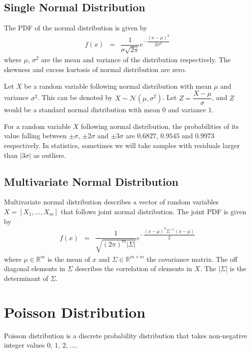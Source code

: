 \subsection{Single Normal Distribution}

The PDF of the normal distribution is given by
\begin{eqnarray}
  f(x) &=& \dfrac{1}{\sigma\sqrt{2\pi}}e^{-\dfrac{(x-\mu)^2}{2\sigma^2}} \nonumber
\end{eqnarray}
where $\mu$, $\sigma^2$ are the mean and variance of the distribution respectively. The skewness and excess kurtosis of normal distribution are zero.

Let $X$ be a random variable following normal distribution with mean $\mu$ and variance $\sigma^2$. This can be denoted by $X\sim\mathcal{N}(\mu, \sigma^2)$. Let $Z=\dfrac{X-\mu}{\sigma}$, and $Z$ would be a standard normal distribution with mean $0$ and variance $1$.

For a random variable $X$ following normal distribution, the probabilities of its value falling between $\pm \sigma$, $\pm 2\sigma$ and $\pm 3\sigma$ are $0.6827$, $0.9545$ and $0.9973$ respectively. In statistics, sometimes we will take samples with residuals larger than $|3\sigma|$ as outliers.

\subsection{Multivariate Normal Distribution}

Multivariate normal distribution describes a vector of random variables $X = \left[X_1, \ldots, X_m\right]$ that follows joint normal distribution. The joint PDF is given by
\begin{eqnarray}
  f(x) &=& \dfrac{1}{\sqrt{(2\pi)^m|\Sigma|}}e^{-\dfrac{(x-\mu)^T\Sigma^{-1}(x-\mu)}{2}} \nonumber
\end{eqnarray}
where $\mu \in \mathbb{R}^m$ is the mean of $x$ and $\Sigma \in \mathbb{R}^{m\times m}$ the covariance matrix. The off diagonal elements in $\Sigma$ describes the correlation of elements in $X$. The $|\Sigma|$ is the determinant of $\Sigma$.

\section{Poisson Distribution}

Poisson distribution is a discrete probability distribution that takes non-negative integer values $0$, $1$, $2$, $\ldots$.

